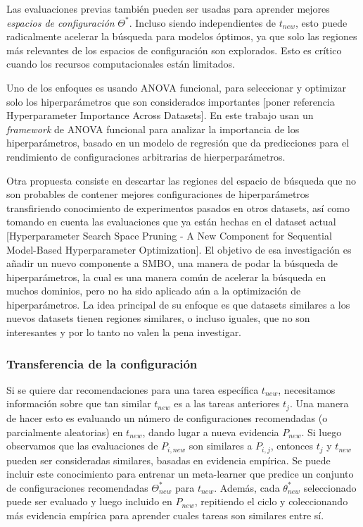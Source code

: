 Las evaluaciones previas también pueden ser usadas para aprender mejores \textit{espacios de configuración} $\Theta^*$. Incluso siendo independientes de $t_{new}$, esto puede radicalmente acelerar la búsqueda para modelos óptimos, ya que solo las regiones más relevantes de los espacios de configuración son explorados. Esto es crítico cuando los recursos computacionales están limitados. 

Uno de los enfoques es usando ANOVA funcional, para seleccionar y optimizar solo los hiperparámetros que son considerados importantes [poner referencia Hyperparameter Importance Across Datasets]. En este trabajo usan un \textit{framework} de ANOVA funcional para analizar la importancia de los hiperparámetros, basado en un modelo de regresión que da predicciones para el rendimiento de configuraciones arbitrarias de hierperparámetros.

Otra propuesta consiste en descartar las regiones del espacio de búsqueda que no son probables de contener mejores configuraciones de hiperparámetros transfiriendo conocimiento de experimentos pasados en otros datasets, así como tomando en cuenta las evaluaciones que ya están hechas en el dataset actual [Hyperparameter Search Space Pruning - A New Component for Sequential Model-Based Hyperparameter Optimization]. El objetivo de esa investigación es añadir un nuevo componente a SMBO, una manera de podar la búsqueda de hiperparámetros, la cual es una manera común de acelerar la búsqueda en muchos dominios, pero no ha sido aplicado aún a la optimización de hiperparámetros. La idea principal de su enfoque es que datasets similares a los nuevos datasets tienen regiones similares, o incluso iguales, que no son interesantes y por lo tanto no valen la pena investigar.

\subsubsection{Transferencia de la configuración}

Si se quiere dar recomendaciones para una tarea específica $t_{new}$, necesitamos información sobre que tan similar $t_{new}$ es a las tareas anteriores $t_j$. Una manera de hacer esto es evaluando un número de configuraciones recomendadas (o parcialmente aleatorias) en $t_{new}$, dando lugar a nueva evidencia $P_{new}$. Si luego observamos que las evaluaciones de $P_{i,new}$ son similares a $P_{i,j}$, entonces $t_j$ y $t_{new}$ pueden ser consideradas similares, basadas en evidencia empírica. Se puede incluir este conocimiento para entrenar un meta-learner que predice un conjunto de configuraciones recomendadas $\Theta_{new}^*$ para $t_{new}$. Además, cada $\theta^*_{new}$ seleccionado puede ser evaluado y luego incluido en $P_{new}$, repitiendo el ciclo y coleccionando más evidencia empírica para aprender cuales tareas son similares entre sí.

